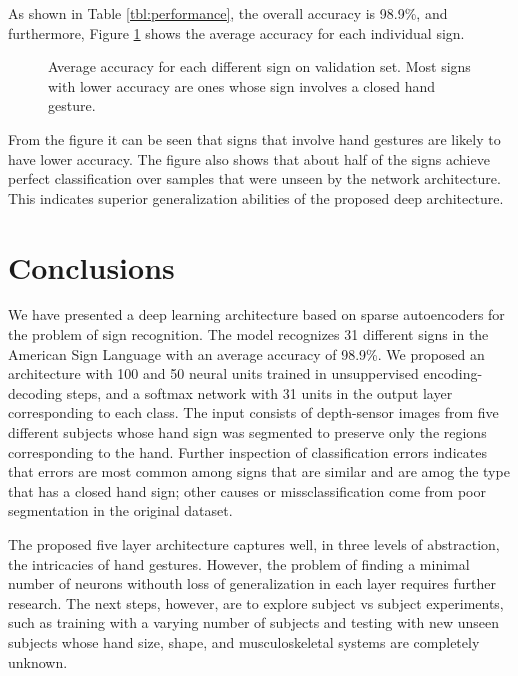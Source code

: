 \documentclass[a4paper]{article}
\begin{document}
As shown in Table \ref{tbl:performance}, the overall accuracy is 98.9\%, and
furthermore, Figure \ref{fig:errPerClass} shows the average accuracy for each
individual sign. 
\begin{figure}
\centering
{}
\caption{Average accuracy for each different sign on validation set. Most signs 
with lower accuracy are ones whose sign involves a closed hand gesture.}
\label{fig:errPerClass}
\end{figure}
From the figure it can be seen that signs that involve hand gestures are likely
to have lower accuracy. The figure also shows that about half of the signs
achieve perfect classification over samples that were unseen by the network
architecture. This indicates superior generalization abilities of the proposed
deep architecture. 


\section{Conclusions}

We have presented a deep learning architecture based on sparse autoencoders
for the problem of sign recognition. The model recognizes 31 different signs in
the American Sign Language with an average accuracy of 98.9\%. We proposed an
architecture with 100 and 50 neural units trained in unsuppervised
encoding-decoding steps, and a softmax network with 31 units in the output
layer corresponding to each class. The input consists of depth-sensor images
from five different subjects whose hand sign was segmented to preserve only the
regions corresponding to the hand. Further inspection of classification errors
indicates that errors are most common among signs that are similar and are amog
the type that has a closed hand sign; other causes or missclassification come
from poor segmentation in the original dataset. 

The proposed five layer architecture captures well, in three levels of
abstraction, the intricacies of hand gestures. However, the problem of finding 
a minimal number of neurons withouth loss of
generalization in each layer requires further research. The next steps,
however, are to explore subject vs subject experiments, such as training with a
varying number of subjects and testing with new unseen subjects whose hand
size, shape, and musculoskeletal systems are completely unknown. 



 

\end{document}
